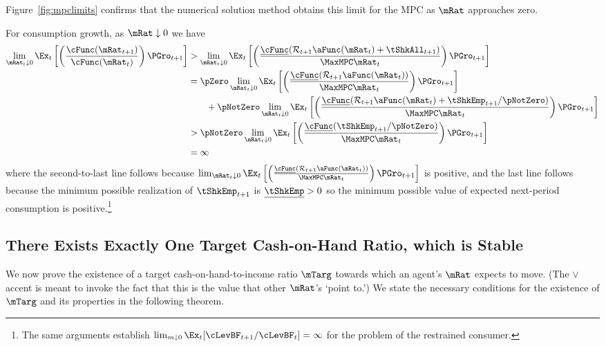 \documentclass[BufferStockTheory]{subfiles}
\begin{document}
Figure~\ref{fig:mpclimits} confirms that the numerical solution method
obtains this limit for the MPC as $\mRat$ approaches zero.

For consumption growth, as $\mRat \downarrow 0$ we have
\begin{align*}
  \lim_{\mRat_{t} \downarrow 0} \Ex_{t}\left[\left(\frac{\cFunc({\mRat}_{t+1})}{\cFunc(\mRat_t)}\right){\PGro}_{t+1}\right]
  & > \lim_{\mRat_{t} \downarrow 0} \Ex_{t}\left[\left(\frac{\ushort{\cFunc}({\mathcal{\mathcal{R}}}_{t+1}\aFunc(\mRat_{t})+{%
    \tShkAll}_{t+1})}{\MaxMPC \mRat_{t}}\right){\PGro}_{t+1}\right]  \notag \\
  & = \pZero \lim_{\mRat_{t} \downarrow 0} \Ex_{t}\left[\left(\frac{\ushort{\cFunc}({\mathcal{\mathcal{R}}}_{t+1}\aFunc(\mRat_{t}))}{\MaxMPC \mRat_{t}}\right){\PGro}_{t+1}\right] \\
  & ~~~~~~ + \pNotZero \lim_{\mRat_{t} \downarrow 0}  \Ex_{t}\left[\left(\frac{\ushort{\cFunc}({\mathcal{\mathcal{R}}}_{t+1}\aFunc(\mRat_{t})+
    \tShkEmp_{t+1}/\pNotZero)}{\MaxMPC \mRat_{t}}\right){\PGro}_{t+1}\right]  \\\notag
  & > \pNotZero \lim_{\mRat_{t} \downarrow 0} \Ex_{t}\left[\left(\frac{\ushort{\cFunc}(
    \tShkEmp_{t+1}/\pNotZero)}{\MaxMPC \mRat_{t}}\right){\PGro}_{t+1}\right] \\
  & = \infty \nonumber
\end{align*}
where the second-to-last line follows because  $\lim_{\mRat_{t} \downarrow 0} \Ex_{t}\left[\left(\frac{\ushort{\cFunc}({\mathcal{\mathcal{R}}}_{t+1}\aFunc(\mRat_{t}))}{\MaxMPC \mRat_{t}}\right){\PGro}_{t+1}\right]$ is positive, and the last line follows because the minimum possible realization of $\tShkEmp_{t+1}$ is $\ushort{\tShkEmp}>0$ so the minimum possible value of expected next-period consumption is positive.\footnote{
  The same arguments establish $\lim_{m \downarrow 0} \Ex_{t}[\cLevBF_{t+1}/\cLevBF_{t}] = \infty$
  for the problem of the restrained consumer.%
}

\hypertarget{onetarget}{}

\subsection{There Exists Exactly One Target Cash-on-Hand Ratio,
  which is Stable}

\label{subsec:onetarget}
\hypertarget{TheoremTarget}{}

We now prove the existence of a target cash-on-hand-to-income ratio $\mTarg$ towards which an agent's $\mRat$ expects to move. (The $\vee$ accent is meant to invoke the fact that this is the value that other $\mRat$'s `point to.') We state the necessary conditions for the existence of $\mTarg$ and its properties in the following theorem.
\end{document}
